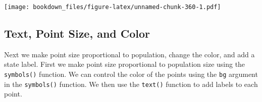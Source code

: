 \documentclass[]{krantz}
\makeatletter
\newenvironment{Shaded}{\begin{snugshade}}{\end{snugshade}}
\newcommand{\KeywordTok}[1]{\textcolor[rgb]{0.27,0.27,0.27}{\textbf{#1}}}
\newcommand{\DataTypeTok}[1]{\textcolor[rgb]{0.27,0.27,0.27}{#1}}
\newcommand{\DecValTok}[1]{\textcolor[rgb]{0.06,0.06,0.06}{#1}}
\newcommand{\StringTok}[1]{\textcolor[rgb]{0.5,0.5,0.5}{#1}}
\newcommand{\OtherTok}[1]{\textcolor[rgb]{0.37,0.37,0.37}{#1}}
\newcommand{\OperatorTok}[1]{\textcolor[rgb]{0.43,0.43,0.43}{\textbf{#1}}}
\newcommand{\NormalTok}[1]{#1}
\newenvironment{kframe}{%
\medskip{}
\setlength{\fboxsep}{.8em}
 \def\at@end@of@kframe{}%
 \ifinner\ifhmode%
  \def\at@end@of@kframe{\end{minipage}}%
  \begin{minipage}{\columnwidth}%
 \fi\fi%
 \def\FrameCommand##1{\hskip\@totalleftmargin \hskip-\fboxsep
 \colorbox{shadecolor}{##1}\hskip-\fboxsep
     \hskip-\linewidth \hskip-\@totalleftmargin \hskip\columnwidth}%
 \MakeFramed {\advance\hsize-\width
   \@totalleftmargin\z@ \linewidth\hsize
   \@setminipage}}%
 {\par\unskip\endMakeFramed%
 \at@end@of@kframe}
\renewenvironment{Shaded}{\begin{kframe}}{\end{kframe}}
\makeatother
\begin{document}
\begin{Shaded}
\end{Shaded}

\texttt{[image: bookdown\_files/figure-latex/unnamed-chunk-360-1.pdf]}

\subsection{Text, Point Size, and
Color}\label{text-point-size-and-color-1}

Next we make point size proportional to population, change the color,
and add a state label. First we make point size proportional to
population size using the \texttt{symbols()} function. We can control
the color of the points using the \texttt{bg} argument in the
\texttt{symbols()} function. We then use the \texttt{text()} function to
add labels to each point.
\end{document}
